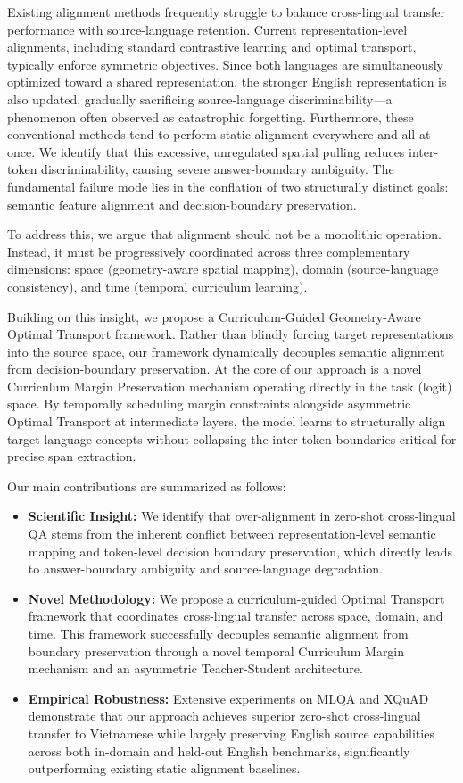 \documentclass[11pt]{article}
\begin{document}
Existing alignment methods frequently struggle to balance cross-lingual transfer performance with source-language retention. Current representation-level alignments, including standard contrastive learning and optimal transport, typically enforce symmetric objectives. Since both languages are simultaneously optimized toward a shared representation, the stronger English representation is also updated, gradually sacrificing source-language discriminability—a phenomenon often observed as catastrophic forgetting. Furthermore, these conventional methods tend to perform static alignment everywhere and all at once. We identify that this excessive, unregulated spatial pulling reduces inter-token discriminability, causing severe answer-boundary ambiguity. The fundamental failure mode lies in the conflation of two structurally distinct goals: semantic feature alignment and decision-boundary preservation.

To address this, we argue that alignment should not be a monolithic operation. Instead, it must be progressively coordinated across three complementary dimensions: space (geometry-aware spatial mapping), domain (source-language consistency), and time (temporal curriculum learning).

Building on this insight, we propose a Curriculum-Guided Geometry-Aware Optimal Transport framework. Rather than blindly forcing target representations into the source space, our framework dynamically decouples semantic alignment from decision-boundary preservation. At the core of our approach is a novel Curriculum Margin Preservation mechanism operating directly in the task (logit) space. By temporally scheduling margin constraints alongside asymmetric Optimal Transport at intermediate layers, the model learns to structurally align target-language concepts without collapsing the inter-token boundaries critical for precise span extraction.

Our main contributions are summarized as follows:
\begin{itemize}
    \item \textbf{Scientific Insight:} We identify that over-alignment in zero-shot cross-lingual QA stems from the inherent conflict between representation-level semantic mapping and token-level decision boundary preservation, which directly leads to answer-boundary ambiguity and source-language degradation.
    \item \textbf{Novel Methodology:} We propose a curriculum-guided Optimal Transport framework that coordinates cross-lingual transfer across space, domain, and time. This framework successfully decouples semantic alignment from boundary preservation through a novel temporal Curriculum Margin mechanism and an asymmetric Teacher-Student architecture.
    \item \textbf{Empirical Robustness:} Extensive experiments on MLQA and XQuAD demonstrate that our approach achieves superior zero-shot cross-lingual transfer to Vietnamese while largely preserving English source capabilities across both in-domain and held-out English benchmarks, significantly outperforming existing static alignment baselines.
\end{itemize}
\end{document}
